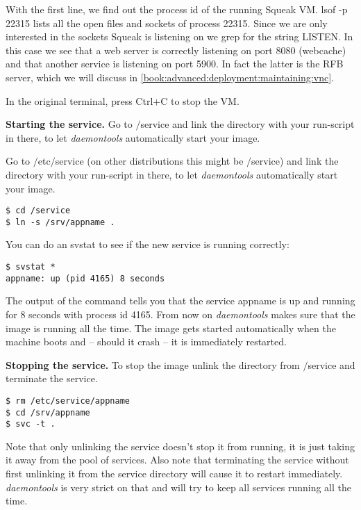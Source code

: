 \documentclass[a4paper,10pt,twoside]{book}
\newcommand{\ct}[1]{{\small\ttfamily\textup{#1}}}
\begin{document}
With the first line,  we find out the process id of the running Squeak VM. \ct{lsof -p 22315} lists all the open files and sockets of process \ct{22315}. Since we are only interested in the sockets Squeak is listening on we grep for the string \ct{LISTEN}. In this case we see that a web server is correctly listening on port 8080 (webcache) and that another service is listening on port 5900. In fact the latter is the RFB server, which we will discuss in \autoref{book:advanced:deployment:maintaining:vnc}.

In the original terminal, press Ctrl+C to stop the VM. 

\textbf{Starting the service.} Go to \ct{$/$service} and link the directory with your run-script in there, to let \textit{daemontools} automatically start your image.

Go to \ct{$/$etc$/$service} (on other distributions this might be \ct{$/$service}) and link 
the directory with your run-script in there, to let \textit{daemontools} automatically start your image.

\begin{lstlisting}
$ cd /service
$ ln -s /srv/appname .
\end{lstlisting}

You can do an \ct{svstat} to see if the new service is running correctly:

\begin{lstlisting}
$ svstat *
appname: up (pid 4165) 8 seconds
\end{lstlisting}

The output of the command tells you that the service \ct{appname} is up and running for 8 seconds with process id 4165. From now on \textit{daemontools} makes sure that the image is running all the time. The image gets started automatically when the machine boots and -- should it crash -- it is immediately restarted.

\textbf{Stopping the service.} To stop the image unlink the directory from \ct{$/$service} and terminate the service.

\begin{lstlisting}
$ rm /etc/service/appname
$ cd /srv/appname 
$ svc -t .
\end{lstlisting}

Note that only unlinking the service doesn't stop it from running, it is just taking it away from the pool of services. Also note that terminating the service without first unlinking it from the service directory will cause it to restart immediately. \textit{daemontools} is very strict on that and will try to keep all services running all the time.
\end{document}
